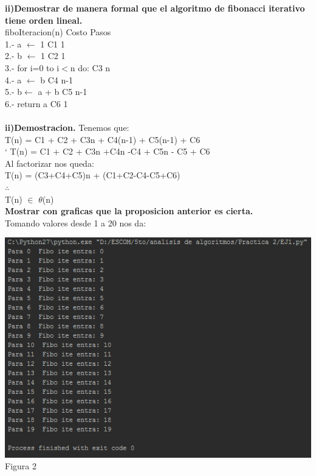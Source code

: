 \documentclass[spanish]{article}
\begin{document}
	{\large {\bf ii)Demostrar de manera formal que el algoritmo de fibonacci iterativo tiene orden lineal.}}\\
	fiboIteracion(n)  \hspace{4cm} Costo \hspace{4cm} Pasos\\
	1.- a $\leftarrow$ 1 \hspace{5cm} C1 \hspace{5cm} 1 \\
	2.- b $\leftarrow$ 1\hspace{5.1cm} C2 \hspace{5cm} 1 \\
	3.- for i=0 to i$<$n do:\hspace{3.3cm} C3 \hspace{5cm} n \\
	4.- \hspace{0.7cm}a $\leftarrow$ b  \hspace{4.3cm} C4 \hspace{5cm} n-1 \\
	5.- \hspace{0.7cm}b$\leftarrow$ a + b  \hspace{3.8cm} C5 \hspace{5cm} n-1 \\
	6.- return a\hspace{4.9cm} C6 \hspace{5cm} 1 \\\\
	{\bf ii)Demostracion.}
	Tenemos que:\\
	T(n) = C1 + C2 + C3n + C4(n-1) + C5(n-1) + C6\\
`	T(n) = C1 + C2 + C3n +C4n -C4 + C5n - C5 + C6\\
	Al factorizar nos queda:\\
	T(n) = (C3+C4+C5)n + (C1+C2-C4-C5+C6)\\
	$\therefore$\\
	T(n) $\in$ $\theta$(n)\\
\newpage
	{\large{\bf Mostrar con graficas que la proposicion anterior es cierta.}}\\
	Tomando valores desde 1 a 20 nos da:
	\begin{center}
				\includegraphics{./imagenes/fiboite1.png}\\
		Figura 2\\
	\end{center}
\end{document}
